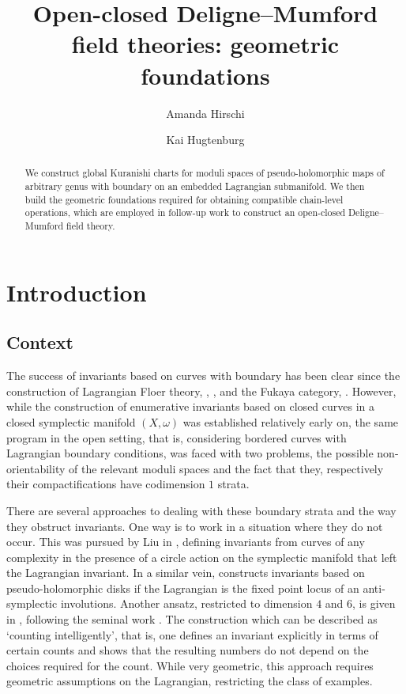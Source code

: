 \documentclass[11pt,psamsfonts, oneside, reqno]{amsart}
\theoremstyle{definition}
\theoremstyle{remark}
\numberwithin{equation}{section}
\begin{document}
\title[Open-closed Deligne--Mumford field theories I]{Open-closed Deligne--Mumford field theories: geometric foundations}
\author{Amanda Hirschi}\author{Kai Hugtenburg}

\begin{abstract} 
	We construct global Kuranishi charts for moduli spaces of pseudo-holomorphic maps of arbitrary genus with boundary on an embedded Lagrangian submanifold. We then build the geometric foundations required for obtaining compatible chain-level operations, which are employed in follow-up work to construct an open-closed Deligne--Mumford field theory.
\end{abstract}

\maketitle
\tableofcontents

\section{Introduction}

\subsection{Context}
The success of invariants based on curves with boundary has been clear since the construction of Lagrangian Floer theory, \cite{Flo88}, \cite{FOOO}, and the Fukaya category, \cite{Sei08}. However, while the construction of enumerative invariants based on closed curves in a closed symplectic manifold $(X,\omega)$ was established relatively early on, the same program in the open setting, that is, considering bordered curves with Lagrangian boundary conditions, was faced with two problems, the possible non-orientability of the relevant moduli spaces and the fact that they, respectively their compactifications have codimension $1$ strata.

There are several approaches to dealing with these boundary strata and the way they obstruct invariants. One way is to work in a situation where they do not occur. This was pursued by Liu in \cite{Liu20}, defining invariants from curves of any complexity in the presence of a circle action on the symplectic manifold that left the Lagrangian invariant. In a similar vein, \cite{Geo16} constructs invariants based on pseudo-holomorphic disks if the Lagrangian is the fixed point locus of an anti-symplectic involutions.
Another ansatz, restricted to dimension $4$ and $6$, is given in \cite{Wel13,Wel15}, following the seminal work \cite{Wel05}. The construction which can be described as `counting intelligently', that is, one defines an invariant explicitly in terms of certain counts and shows that the resulting numbers do not depend on the choices required for the count. While very geometric, this approach requires geometric assumptions on the Lagrangian, restricting the class of examples.
\end{document}
